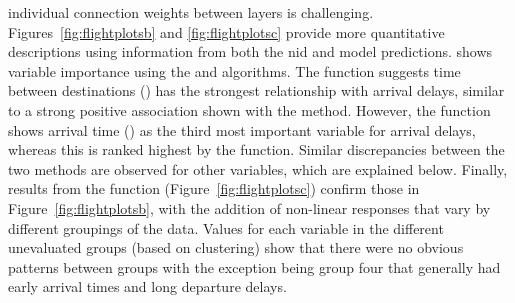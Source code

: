 \documentclass[article]{jss}
\begin{document}
individual connection weights between layers is challenging.
Figures~\ref{fig:flightplotsb} and \ref{fig:flightplotsc} provide more
quantitative descriptions using information from both the \ac{nid} and
model predictions.   shows variable importance
using the  and  algorithms.  The
 function suggests time between destinations
() has the strongest relationship with arrival delays,
similar to a strong positive association shown with the 
method. However, the  function shows arrival time
() as the third most important variable for arrival
delays, whereas this is ranked highest by the 
function. Similar discrepancies between the two methods are observed
for other variables, which are explained below. Finally, results from
the  function (Figure~\ref{fig:flightplotsc}) confirm those
in Figure~\ref{fig:flightplotsb}, with the addition of non-linear responses
that vary by different groupings of the data.  Values for each
variable in the different unevaluated groups (based on clustering)
show that there were no obvious patterns between groups with the
exception being group four that generally had early arrival times and
long departure delays.
\end{document}
